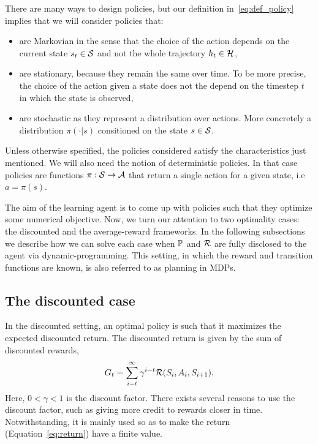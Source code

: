 There are many ways to design policies, but our definition in~\ref{eq:def_policy} implies that we will consider policies that:
\begin{itemize}
  \item are Markovian in the sense that the choice of the action depends on the current state $s_t\in\mathcal{S}$ and not the whole trajectory $h_t\in\mathcal{H}$, 
  \item are stationary, because they remain the same over time. To be more precise, the choice of the action given a state does not the depend on the timestep $t$ in which the state is observed,
  \item are stochastic as they represent a distribution over actions. More concretely a distribution $\pi(\cdot\lvert s)$ consitioned on the state $s\in\mathcal{S}$. 
\end{itemize}
Unless otherwise specified, the policies considered satisfy the characteristics just mentioned. We will also need the notion of deterministic policies. In that case policies are functions $\pi:\mathcal{S}\rightarrow\mathcal{A}$ that return a single action for a given state, i.e~$a=\pi(s)$.


The aim of the learning agent is to come up with policies such that they optimize some numerical objective. Now, we turn our attention to two optimality cases: the discounted and the average-reward frameworks. In the following subsections we describe how we can solve each case when $\mathbb{P}$ and $\mathcal{R}$ are fully disclosed to the agent via dynamic-programming. This setting, in which the reward and transition functions are known, is also referred to as planning in MDPs.


\subsection{The discounted case}
In the discounted setting, an optimal policy is such that it maximizes the expected discounted return. The discounted return is given by the sum of discounted rewards, 
\begin{equation}
  G_t = \sum_{i=t} ^\infty \gamma ^ {i-t} \mathcal{R}(S_i, A_i, S_{i+1}).
  \label{eq:return}
\end{equation}
Here, $0<\gamma<1$ is the discount factor. There exists several reasons to use the discount factor, such as giving more credit to rewards closer in time. Notwithstanding, it is mainly used so as to make the return (Equation~\ref{eq:return}) have a finite value.

